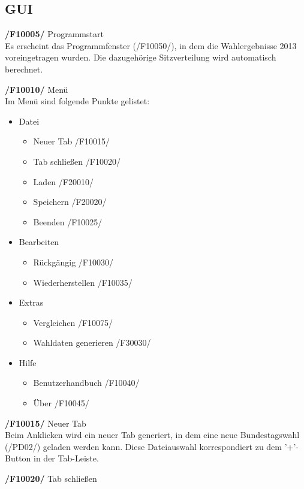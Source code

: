 \documentclass[10pt,a4paper]{article}
\begin{document}
\subsection{GUI}
\begin{list}{\quad}{}
	\item \textbf{/F10005/} Programmstart \hfill \\
	Es erscheint das Programmfenster (/F10050/), in dem die Wahlergebnisse 2013 voreingetragen wurden. Die dazugehörige Sitzverteilung wird automatisch berechnet.
	\item \textbf{/F10010/} Menü \hfill \\
	Im Menü sind folgende Punkte gelistet:
		
	\begin{itemize}
		\item Datei
		\begin{itemize}
			\item Neuer Tab /F10015/
			\item Tab schließen /F10020/
			\item Laden /F20010/
			\item Speichern /F20020/
			\item Beenden /F10025/
		\end{itemize}
		\item Bearbeiten
		\begin{itemize}
			\item Rückgängig /F10030/
			\item Wiederherstellen /F10035/
		\end{itemize}
		\item Extras
		\begin{itemize}
			\item Vergleichen /F10075/
			\item Wahldaten generieren /F30030/
		\end{itemize}
		\item Hilfe
		\begin{itemize}
			\item Benutzerhandbuch /F10040/
			\item Über /F10045/
		\end{itemize}	
	\end{itemize}
	\item \textbf{/F10015/} Neuer Tab \hfill \\
	Beim Anklicken wird ein neuer Tab generiert, in dem eine neue Bundestagswahl (/PD02/) geladen werden kann. Diese Dateiauswahl korrespondiert zu dem '+'-Button in der Tab-Leiste.
	\item \textbf{/F10020/} Tab schließen \hfill \\

\end{list}
\end{document}
